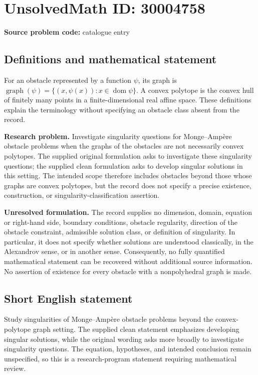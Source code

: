 \documentclass[11pt]{article}
\begin{document}
\section*{UnsolvedMath ID: 30004758}
\textbf{Source problem code:} catalogue entry
\subsection{Definitions and mathematical statement}
For an obstacle represented by a function \(\psi\), its graph is \(\operatorname{graph}(\psi)=\{(x,\psi(x)):x\in\operatorname{dom}\psi\}\). A convex polytope is the convex hull of finitely many points in a finite-dimensional real affine space. These definitions explain the terminology without specifying an obstacle class absent from the record.

\textbf{Research problem.} Investigate singularity questions for Monge--Amp\`ere obstacle problems when the graphs of the obstacles are not necessarily convex polytopes. The supplied original formulation asks to investigate these singularity questions; the supplied clean formulation asks to develop singular solutions in this setting. The intended scope therefore includes obstacles beyond those whose graphs are convex polytopes, but the record does not specify a precise existence, construction, or singularity-classification assertion.

\textbf{Unresolved formulation.} The record supplies no dimension, domain, equation or right-hand side, boundary conditions, obstacle regularity, direction of the obstacle constraint, admissible solution class, or definition of singularity. In particular, it does not specify whether solutions are understood classically, in the Alexandrov sense, or in another sense. Consequently, no fully quantified mathematical statement can be recovered without additional source information. No assertion of existence for every obstacle with a nonpolyhedral graph is made.
\subsection{Short English statement}
Study singularities of Monge--Amp\`ere obstacle problems beyond the convex-polytope graph setting. The supplied clean statement emphasizes developing singular solutions, while the original wording asks more broadly to investigate singularity questions. The equation, hypotheses, and intended conclusion remain unspecified, so this is a research-program statement requiring mathematical review.
\end{document}
